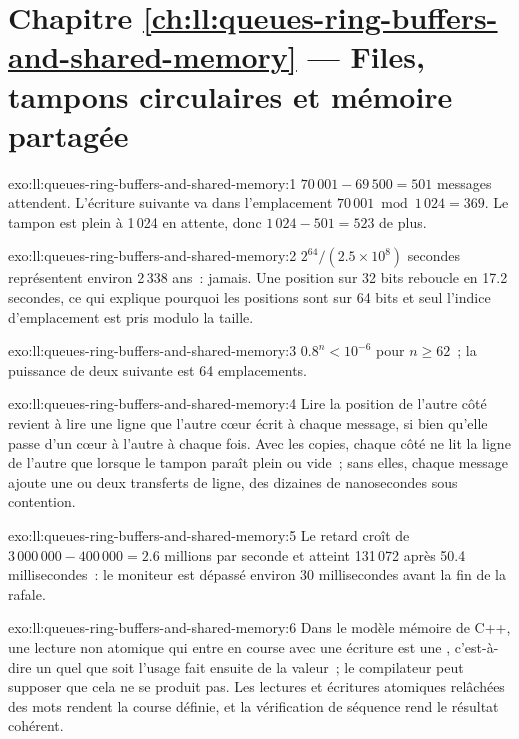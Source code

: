 \section*{Chapitre \ref{ch:ll:queues-ring-buffers-and-shared-memory} --- Files, tampons circulaires et mémoire partagée}

\begin{solution}{exo:ll:queues-ring-buffers-and-shared-memory:1}
$70\,001 - 69\,500 = 501$ messages attendent. L'écriture suivante va dans l'emplacement $70\,001 \bmod 1\,024 = 369$. Le tampon est plein à 1\,024 en attente,
donc $1\,024 - 501 = 523$ de plus.
\end{solution}

\begin{solution}{exo:ll:queues-ring-buffers-and-shared-memory:2}
$2^{64}/(2.5 \times 10^8)$ secondes représentent environ 2\,338 ans~: jamais. Une position sur 32 bits reboucle en 17.2 secondes, ce qui explique pourquoi les positions sont
sur 64 bits et seul l'indice d'emplacement est pris modulo la taille.
\end{solution}

\begin{solution}{exo:ll:queues-ring-buffers-and-shared-memory:3}
$0.8^n < 10^{-6}$ pour $n \ge 62$~; la puissance de deux suivante est 64 emplacements.
\end{solution}

\begin{solution}{exo:ll:queues-ring-buffers-and-shared-memory:4}
Lire la position de l'autre côté revient à lire une ligne que l'autre cœur écrit à chaque message, si bien qu'elle passe d'un cœur à
l'autre à chaque fois. Avec les copies, chaque côté ne lit la ligne de l'autre que lorsque le tampon paraît plein ou vide~; sans elles, chaque message ajoute une
ou deux transferts de ligne, des dizaines de nanosecondes sous contention.
\end{solution}

\begin{solution}{exo:ll:queues-ring-buffers-and-shared-memory:5}
Le retard croît de $3\,000\,000 - 400\,000 = 2.6$ millions par seconde et atteint 131\,072 après 50.4 millisecondes~: le moniteur est
dépassé environ 30 millisecondes avant la fin de la rafale.
\end{solution}

\begin{solution}{exo:ll:queues-ring-buffers-and-shared-memory:6}
Dans le modèle mémoire de C++, une lecture non atomique qui entre en course avec une écriture est une , c'est-à-dire un  quel que soit l'usage fait ensuite
de la valeur~; le compilateur peut supposer que cela ne se produit pas. Les lectures et écritures atomiques relâchées des mots rendent la course définie,
et la vérification de séquence rend le résultat cohérent.
\end{solution}

